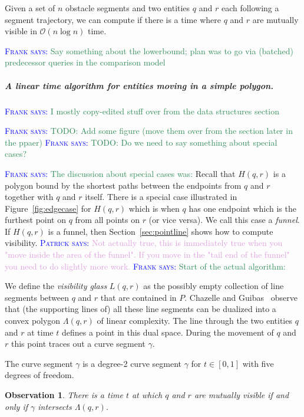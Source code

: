 \documentclass[UKenglish]{lipics-v2019}
\newcommand{\myremark}[4]{\textcolor{blue}{\textsc{#1 #2:}} \textcolor{#4}{\textsf{#3}}}
\newcommand{\frank}[2][says]{\myremark{Frank}{#1}{#2}{SeaGreen}}
\newcommand{\patrick}[2][says]{\myremark{Patrick}{#1}{#2}{Plum}}
\newtheorem{observation}{Observation}
\begin{document}
\begin{theorem}
    Given a set of $n$ obstacle segments and two entities $q$ and $r$ each following a segment trajectory, we can compute if there is a time where $q$ and $r$ are mutually visible in $\mathcal{O}(n \log n)$ time.
\end{theorem}

\frank{Say something about the lowerbound; plan was to go via
  (batched) predecessor queries in the comparison model}

\subparagraph{A linear time algorithm for entities moving in a simple polygon.}

\frank{I mostly copy-edited stuff over from the data structures section}

\frank{TODO: Add some figure (move them over from the section later in the ppaer)}
\frank{TODO: Do we need to say something about special cases?}

\frank{The discussion about special cases was:}
Recall that $H(q,r)$ is a polygon bound by the shortest paths between the
endpoints from $q$ and $r$ together with $q$ and $r$ itself. There is a special
case illustrated in Figure~\ref{fig:edgecase} for $H(q,r)$ which is when $q$
has one endpoint which is the furthest point on $q$ from all points on $r$ (or
vice versa). We call this case a \emph{funnel}. If $H(q,r)$ is a funnel, then
Section~\ref{sec:pointline} shows how to compute visibility. \patrick{Not
  actually true, this is immediately true when you "move inside the area of the
  funnel". If you move in the "tail end of the funnel" you need to do slightly
  more work.}
\frank{Start of the actual algorithm:}


We define the \emph{visibility glass} $L(q,r)$ as the possibly empty collection
of line segments between $q$ and $r$ that are contained in $P$. Chazelle and
Guibas~\cite{Chazelle1989} observe that (the supporting lines of) all these
line segments can be dualized into a convex polygon $\Lambda(q,r)$ of linear
complexity. The line through the two entities $q$ and $r$ at time $t$ defines a
point in this dual space. During the movement of $q$ and $r$ this point traces
out a curve segment $\gamma$.

\begin{lemma}
  \label{lemma:hyperbola}
  The curve segment $\gamma$ is a degree-2 curve segment $\gamma$ for
  $t \in [0,1]$ with five degrees of freedom.
\end{lemma}

\begin{observation}
  \label{obs:visibile}
  There is a time $t$ at which $q$ and $r$ are mutually visible if and only if
  $\gamma$ intersects $\Lambda(q,r)$.
\end{observation}
\end{document}
